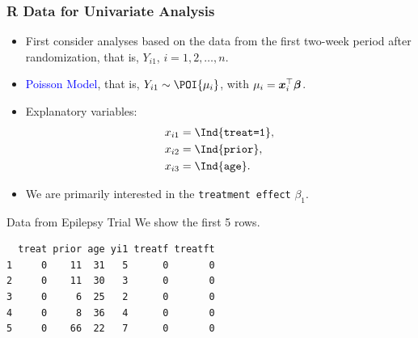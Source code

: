 \documentclass[oneside]{book}\usepackage[]{graphicx}\usepackage[svgnames]{xcolor}
\makeatletter
\newenvironment{kframe}{%
 \def\at@end@of@kframe{}%
 \ifinner\ifhmode%
  \def\at@end@of@kframe{\end{minipage}}%
  \begin{minipage}{\columnwidth}%
 \fi\fi%
 \def\FrameCommand##1{\hskip\@totalleftmargin \hskip-\fboxsep
 \colorbox{shadecolor}{##1}\hskip-\fboxsep
     \hskip-\linewidth \hskip-\@totalleftmargin \hskip\columnwidth}%
 \MakeFramed {\advance\hsize-\width
   \@totalleftmargin\z@ \linewidth\hsize
   \@setminipage}}%
 {\par\unskip\endMakeFramed%
 \at@end@of@kframe}
\newenvironment{knitrout}{}{} %
\let\log\relax%
\providecommand{\Vector}[1]{\bm{#1}}%
\makeatother
\begin{document}
\subsubsection*{R Data for Univariate Analysis}
\begin{itemize}
    \item First consider analyses based on the data from the first two-week period after
          randomization, that is, $ Y_{i1} $, $ i=1,2,\ldots,n $.
    \item \textcolor{Blue}{Poisson Model}, that is, $ Y_{i1}\sim \POI{\mu_i} $, with $ \log{\mu_i}=\Vector{x}_i^\top \Vector{\beta} $.
    \item Explanatory variables:
          \begin{align*}
              x_{i1} & =\Ind{\texttt{treat=1}}, \\
              x_{i2} & =\Ind{\texttt{prior}},   \\
              x_{i3} & =\Ind{\texttt{age}}.
          \end{align*}
    \item We are primarily interested in the \texttt{treatment effect} $ \beta_1 $.
\end{itemize}
\begin{Example}{Data from Epilepsy Trial}
    We show the first 5 rows.
\begin{knitrout}
\color{fgcolor}\begin{kframe}
\begin{verbatim}
  treat prior age yi1 treatf treatft
1     0    11  31   5      0       0
2     0    11  30   3      0       0
3     0     6  25   2      0       0
4     0     8  36   4      0       0
5     0    66  22   7      0       0
\end{verbatim}
\end{kframe}
\end{knitrout}
\end{Example}
\end{document}
